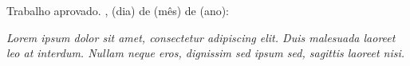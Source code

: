 \documentclass[
	12pt,				%
	openright,			%
	oneside,			%
	a4paper,			%
	english,			%
	french,				%
	spanish,			%
	brazil				%
	]{abntex2}
\begin{document}
\begin{folhadeaprovacao}
  \begin{center}
    {\ABNTEXchapterfont\large\imprimirautor}
    \vspace*{\fill}\vspace*{\fill}
    \begin{center}
      \ABNTEXchapterfont\bfseries\Large\imprimirtitulo
    \end{center}
    \vspace*{\fill}
    \hspace{.45\textwidth}
    \begin{minipage}{.5\textwidth}
        \imprimirpreambulo
    \end{minipage}%
    \vspace*{\fill}
   \end{center}
   Trabalho aprovado. \imprimirlocal, (dia) de (mês) de (ano):
   \begin{center}
    \vspace*{0.5cm}
    {\large\imprimirlocal}
    \par
    {\large\imprimirdata}
    \vspace*{1cm}
  \end{center}  
\end{folhadeaprovacao}


\begin{dedicatoria}
   \vspace*{\fill}
   \centering
   \noindent
   \textit{Lorem ipsum dolor sit amet, consectetur adipiscing elit. Duis malesuada laoreet leo at interdum. Nullam neque eros, dignissim sed ipsum sed, sagittis laoreet nisi.} \vspace*{\fill}
\end{dedicatoria}
\end{document}
